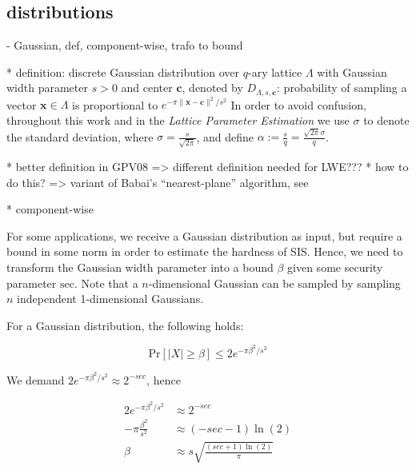 \documentclass[
  a4paper,  %
  twoside,  %
  bibliography=totoc,
  headsepline,
  cleardoublepage=empty,
  parskip=half,
  draft=false
]{scrbook}
\begin{document}
\subsection{distributions}

  - Gaussian, def, component-wise, trafo to bound %

    * definition:
      discrete Gaussian distribution over $q$-ary lattice $\Lambda$ with Gaussian width parameter $s > 0$ and center $\mathbf{c}$, denoted by $D_{\Lambda, s, \mathbf{c}}$: probability of sampling a vector $\mathbf{x}\in \Lambda$ is proportional to $e^{-\pi \|\mathbf{x} - \mathbf{c}\|^2/s^2}$ %
      In order to avoid confusion, throughout this work and in the \textit{Lattice Parameter Estimation} we use $\sigma$ to denote the standard deviation, where $\sigma = \frac{s}{\sqrt{2 \pi}}$, and define $\alpha := \frac{s}{q} = \frac{\sqrt{2\pi} \sigma}{q}$. 

    * better definition in GPV08 => different definition needed for LWE??? %
    * how to do this? => variant of Babai's ``nearest-plane'' algorithm, see \cite{GPV08} %

    * component-wise
    

    For some applications, we receive a Gaussian distribution as input, but require a bound in some norm in order to estimate the hardness of SIS. Hence, we need to transform the Gaussian width parameter into a bound $\beta$ given some security parameter $\text{sec}$. Note that a $n$-dimensional Gaussian can be sampled by sampling $n$ independent 1-dimensional Gaussians. %
        
    For a Gaussian distribution, the following holds: 
    
    \begin{equation}
      \text{Pr}\left[ |X| \geq \beta \right] \leq 2 e^{-\pi \beta^2/s^2}
    \end{equation}
    
    We demand $2 e^{-\pi \beta^2/s^2} \approx 2^{-sec}$, hence
    
    \begin{align*}
      2 e^{-\pi \beta^2/s^2} &\approx 2^{-sec}\\
      -\pi \frac{\beta^2}{s^2} &\approx (-sec - 1)\ln (2)\\
      \beta  &\approx s \sqrt{\frac{(sec + 1) \ln(2)}{\pi}}
    \end{align*}
\end{document}
